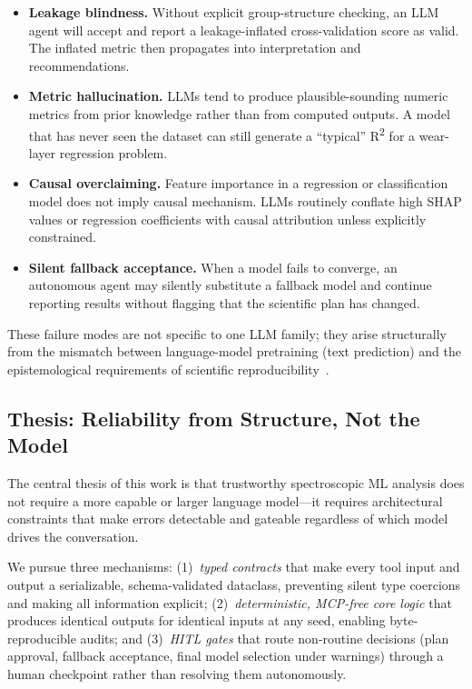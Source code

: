 \begin{itemize}
  \item \textbf{Leakage blindness.} Without explicit group-structure checking,
    an LLM agent will accept and report a leakage-inflated cross-validation
    score as valid. The inflated metric then propagates into interpretation and
    recommendations.
  \item \textbf{Metric hallucination.} LLMs tend to produce plausible-sounding
    numeric metrics from prior knowledge rather than from computed outputs.
    A model that has never seen the dataset can still generate a ``typical''
    R\textsuperscript{2} for a wear-layer regression problem.
  \item \textbf{Causal overclaiming.} Feature importance in a regression or
    classification model does not imply causal mechanism.
    LLMs routinely conflate high SHAP values or regression coefficients with
    causal attribution unless explicitly constrained.
  \item \textbf{Silent fallback acceptance.} When a model fails to converge,
    an autonomous agent may silently substitute a fallback model and continue
    reporting results without flagging that the scientific plan has changed.
\end{itemize}

These failure modes are not specific to one LLM family; they arise structurally
from the mismatch between language-model pretraining (text prediction) and
the epistemological requirements of scientific reproducibility~\citep{kapoor2023leakage}.

\subsection{Thesis: Reliability from Structure, Not the Model}

The central thesis of this work is that trustworthy spectroscopic ML analysis
does not require a more capable or larger language model---it requires
architectural constraints that make errors detectable and gateable regardless
of which model drives the conversation.

We pursue three mechanisms:
(1)~\emph{typed contracts} that make every tool input and output a
serializable, schema-validated dataclass, preventing silent type coercions and
making all information explicit;
(2)~\emph{deterministic, MCP-free core logic} that produces identical outputs
for identical inputs at any seed, enabling byte-reproducible audits; and
(3)~\emph{HITL gates} that route non-routine decisions (plan approval,
fallback acceptance, final model selection under warnings) through a human
checkpoint rather than resolving them autonomously.

